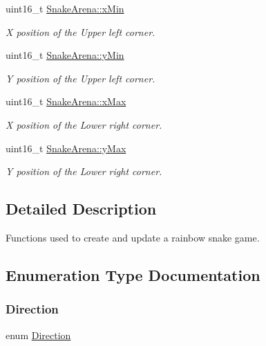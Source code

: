 \begin{DoxyCompactItemize}
uint16\+\_\+t \mbox{\hyperlink{group__snake_gac0ebaa81c65de20a87951b73f9681ca1}{Snake\+Arena\+::x\+Min}}
\begin{DoxyCompactList}\small\item\em X position of the Upper left corner. \end{DoxyCompactList}\item 
uint16\+\_\+t \mbox{\hyperlink{group__snake_ga7e608098f74d891fb16367603bd4db33}{Snake\+Arena\+::y\+Min}}
\begin{DoxyCompactList}\small\item\em Y position of the Upper left corner. \end{DoxyCompactList}\item 
uint16\+\_\+t \mbox{\hyperlink{group__snake_ga30a82bd4fdcd55e4ad4c85a597b39e5e}{Snake\+Arena\+::x\+Max}}
\begin{DoxyCompactList}\small\item\em X position of the Lower right corner. \end{DoxyCompactList}\item 
uint16\+\_\+t \mbox{\hyperlink{group__snake_ga46349d738f8a96533df9e57ece666fbc}{Snake\+Arena\+::y\+Max}}
\begin{DoxyCompactList}\small\item\em Y position of the Lower right corner. \end{DoxyCompactList}\end{DoxyCompactItemize}


\subsection{Detailed Description}
Functions used to create and update a rainbow snake game. 

\subsection{Enumeration Type Documentation}
\mbox{\label{group__snake_ga224b9163917ac32fc95a60d8c1eec3aa}} 
\subsubsection{\texorpdfstring{Direction}{Direction}}
{\footnotesize\ttfamily enum \mbox{\hyperlink{group__snake_ga224b9163917ac32fc95a60d8c1eec3aa}{Direction}}}



